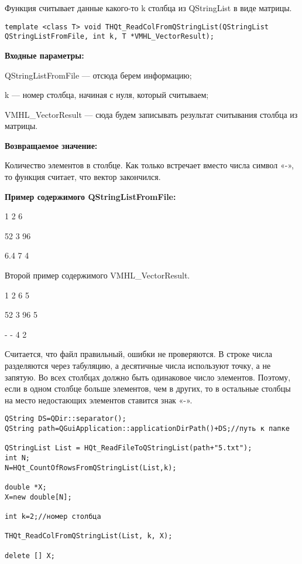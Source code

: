 \documentclass[a4paper,12pt]{article}
\begin{document}
Функция считывает данные какого-то k столбца из QStringList в виде матрицы.


\begin{lstlisting}[label=code_syntax_THQt_ReadColFromQStringList2,caption=Синтаксис]
template <class T> void THQt_ReadColFromQStringList(QStringList QStringListFromFile, int k, T *VMHL_VectorResult);
\end{lstlisting}

\textbf{Входные параметры:}

QStringListFromFile --- отсюда берем информацию;

     k --- номер столбца, начиная с нуля, который считываем;
	 
     VMHL\_VectorResult --- сюда будем записывать результат считывания столбца из матрицы.

\textbf{Возвращаемое значение:}

Количество элементов в столбце. Как только встречает вместо числа символ «-», то функция считает, что вектор закончился.

\textbf{Пример содержимого QStringListFromFile:}

1	2	6

52	3	96

6.4	7	4

    Второй пример содержимого VMHL\_VectorResult.
	
1	2	6	5

52	3	96	5

-	-	4   2

Считается, что файл правильный, ошибки не проверяются. В строке числа разделяются через табуляцию, а десятичные числа используют точку, а не запятую. Во всех столбцах должно быть одинаковое число элементов. Поэтому, если в одном столбце больше элементов, чем в других, то в остальные столбцы на место недостающих элементов ставится знак «-».


\begin{lstlisting}[label=code_use_THQt_ReadColFromQStringList2,caption=Пример использования]
QString DS=QDir::separator();
QString path=QGuiApplication::applicationDirPath()+DS;//путь к папке

QStringList List = HQt_ReadFileToQStringList(path+"5.txt");
int N;
N=HQt_CountOfRowsFromQStringList(List,k);

double *X;
X=new double[N];

int k=2;//номер столбца

THQt_ReadColFromQStringList(List, k, X);

delete [] X;
\end{lstlisting}
\end{document}
